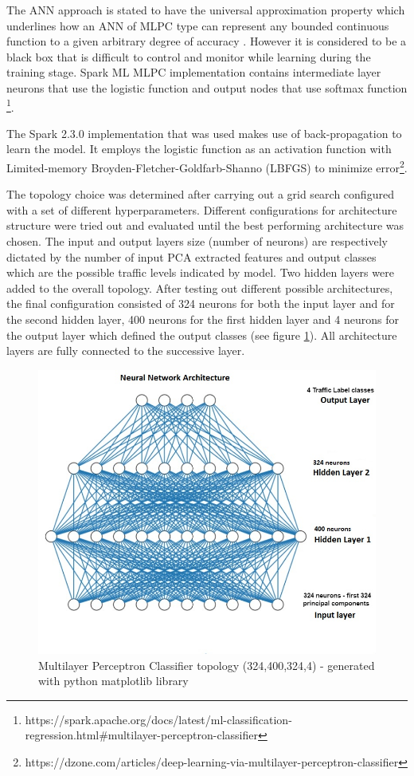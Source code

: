 \documentclass[12pt, a4paper]{report}
\theoremstyle{definition}
\theoremstyle{definition}%
\theoremstyle{definition}%
\theoremstyle{definition}%
\theoremstyle{definition}%
\theoremstyle{definition}%
\begin{document}
The ANN approach is stated to have the universal approximation property which underlines how an ANN of MLPC type can represent any bounded continuous function to a given arbitrary degree of accuracy \cite{hornik1990universal}. However it is considered to be a black box that is difficult to control and monitor while learning during the training stage. Spark ML MLPC implementation contains intermediate layer neurons that use the logistic function and output nodes that use softmax function \footnote{https://spark.apache.org/docs/latest/ml-classification-regression.html\#multilayer-perceptron-classifier}.

The Spark 2.3.0 implementation that was used makes use of back-propagation to learn the model. It employs the logistic function as an activation function with Limited-memory Broyden-Fletcher-Goldfarb-Shanno (LBFGS) to minimize error\footnote{https://dzone.com/articles/deep-learning-via-multilayer-perceptron-classifier}.  


The topology choice was determined after carrying out a grid search configured with a set of different hyperparameters. Different configurations for architecture structure were tried out and evaluated until the best performing architecture was chosen. The input and output layers size (number of neurons) are respectively dictated by the number of input PCA extracted features and output classes which are the possible traffic levels indicated by model. Two hidden layers were added to the overall topology. After testing out different possible architectures, the final configuration consisted of 324 neurons for both the input layer and for the second hidden layer, 400 neurons for the first hidden layer and 4 neurons for the output layer which defined the output classes (see figure \ref{fig:ann_topology}). All architecture layers are fully connected to the successive layer. 


\begin{figure}[!]	
	\includegraphics[scale=0.50]{ann_topology.jpg}
	\centering
	\caption[Multilayer Perceptron Classifier topology]{Multilayer Perceptron Classifier topology (324,400,324,4) - generated with python matplotlib library }
	\label{fig:ann_topology}
\end{figure}
 
\end{document}
